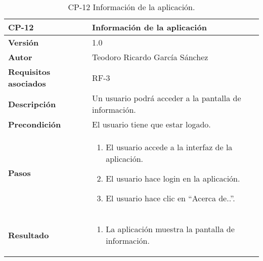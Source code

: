 \begin{table}[p]
	\centering
	\begin{tabularx}{\linewidth}{ p{} p{} }
		\toprule
		\textbf{CP-12}    & \textbf{Información de la aplicación}\\
		\toprule
		\textbf{Versión}              & 1.0    \\
		\textbf{Autor}                & Teodoro Ricardo García Sánchez \\
		\textbf{Requisitos asociados} & RF-3 \\
		\textbf{Descripción}          & Un usuario podrá acceder a la pantalla de información. \\
		\textbf{Precondición}         & El usuario tiene que estar logado. \\
		\textbf{Pasos}             &
		\begin{enumerate}
			\def\labelenumi{\arabic{enumi}.}
			\tightlist
			\item El usuario accede a la interfaz de la aplicación.
			\item El usuario hace login en la aplicación.
			\item El usuario hace clic en ``Acerca de..''.
		\end{enumerate}\\
		\textbf{Resultado}          & 
		\begin{enumerate}
			\item La aplicación muestra la pantalla de información.
		\end{enumerate}\\
		\bottomrule
	\end{tabularx}
	\caption{CP-12 Información de la aplicación.}
\end{table}

